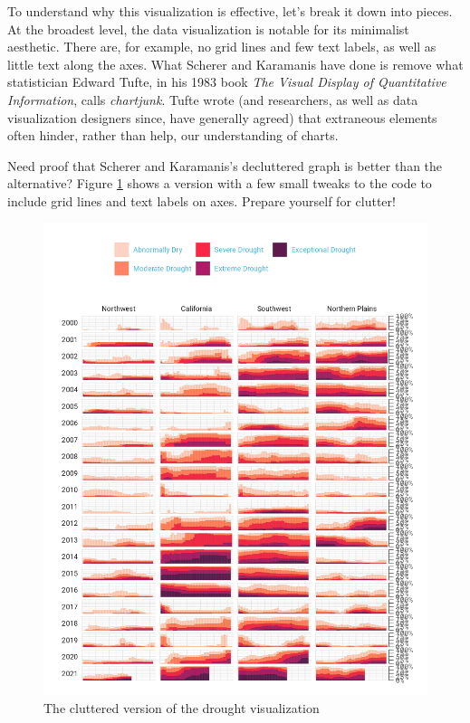 \documentclass[
]{book}
\begin{document}
To understand why this visualization is effective, let's break it down into pieces. At the broadest level, the data visualization is notable for its minimalist aesthetic. There are, for example, no grid lines and few text labels, as well as little text along the axes. What Scherer and Karamanis have done is remove what statistician Edward Tufte, in his 1983 book \emph{The Visual Display of Quantitative Information}, calls \emph{chartjunk}. Tufte wrote (and researchers, as well as data visualization designers since, have generally agreed) that extraneous elements often hinder, rather than help, our understanding of charts.

Need proof that Scherer and Karamanis's decluttered graph is better than the alternative? Figure \ref{fig:cluttered-viz} shows a version with a few small tweaks to the code to include grid lines and text labels on axes. Prepare yourself for clutter!

\begin{figure}
\includegraphics[width=1\linewidth]{data-viz_files/figure-latex/cluttered-viz-1} \caption{The cluttered version of the drought visualization}\label{fig:cluttered-viz}
\end{figure}
\end{document}
